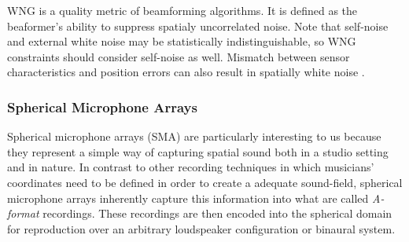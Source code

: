
WNG is a quality metric of beamforming algorithms. It is defined as the beaformer's ability to suppress spatialy uncorrelated noise. Note that self-noise and external white noise may be statistically indistinguishable, so WNG constraints should consider self-noise as well. Mismatch between sensor characteristics and position errors can also result in spatially white noise \cite{mabande2009design}.  




\subsubsection{Spherical Microphone Arrays}

Spherical microphone arrays (SMA) are particularly interesting to us because they represent a simple way of capturing spatial sound both in a studio setting and in nature. In contrast to other recording techniques in which musicians' coordinates need to be defined in order to create a adequate sound-field, spherical microphone arrays inherently capture this information into what are called \textit{A-format} recordings. These recordings are then encoded into the spherical domain for reproduction over an arbitrary loudspeaker configuration or binaural system. 

